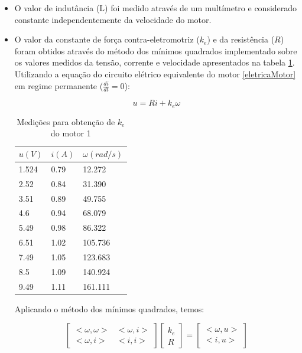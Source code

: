 \documentclass[]{politex}
\begin{document}
\begin{itemize}
\item O valor de indutância (L) foi medido através de um multímetro e considerado constante independentemente da velocidade do motor.

\item O valor da constante de força contra-eletromotriz ($k_{e}$) e da resistência ($R$) foram obtidos através do método dos mínimos quadrados implementado sobre os valores medidos da tensão, corrente e velocidade apresentados na tabela \ref{MMQke}. Utilizando a equação do circuito elétrico equivalente do motor \eqref{eletricaMotor} em regime permanente ($\frac{di}{dt} = 0$): 

\begin{equation}
	   u =  R i + k_{e} \omega
\end{equation}

\begin{table}[H]
\centering
\caption{Medições para obtenção de $k_{e}$ do motor 1}
\label{MMQke}
\begin{tabular}{l|l|l}
$u(V)$     & $i(A)$    & $\omega (rad/s)$        \\ \hline
1.524 & 0.79 & 12.272  \\
2.52  & 0.84 & 31.390  \\
3.51  & 0.89 & 49.755  \\
4.6   & 0.94 & 68.079  \\
5.49  & 0.98 & 86.322  \\
6.51  & 1.02 & 105.736 \\
7.49  & 1.05 & 123.683 \\
8.5   & 1.09 & 140.924 \\
9.49  & 1.11 & 161.111
\end{tabular}
\end{table}

Aplicando o método dos mínimos quadrados, temos:

\begin{equation}
\begin{bmatrix}
<\omega, \omega> & <\omega, i>\\
<\omega, i>      & <i, i>
\end{bmatrix}
\begin{bmatrix}
k_{e}\\
R
\end{bmatrix}= 
\begin{bmatrix}
<\omega, u>\\
<i, u>
\end{bmatrix}
\end{equation}


\end{itemize}
\end{document}
